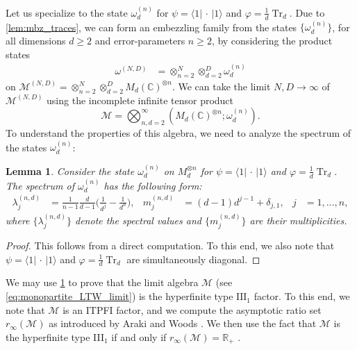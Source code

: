 \documentclass[a4paper, 10pt, onecolumn, accepted=2025-07-22]{quantumarticle}
\newtheorem{lemma}[theorem]{Lemma}
\theoremstyle{definition}
\newcommand{\ket}[1]{|#1\rangle}
\newcommand{\bra}[1]{\langle#1|}
\newcommand{\oo}{\infty}
\newcommand{\ox}{\otimes}
\newcommand{\mc}{\mathcal}
\newcommand{\III}{{\mathrm{III}}}
\newcommand{\up}[1]{^{(#1)}}
\DeclareMathOperator{\tr}{Tr}
\def\CC{{\mathbb C}}
\def\M{{\mc M}}
\def\RR{{\mathbb R}}
\newcommand*{\1}{\text{\usefont{U}{bbold}{m}{n}1}}
\newcommand{\placeholder}[0]{{\,\cdot\,}}
\begin{document}
Let us specialize to the state $\omega^{(n)}_{d}$ for $\psi = \bra{1}\placeholder\ket{1}$ and $\varphi = \tfrac{1}{d}\tr_{d}$. Due to \cref{lem:mbz_traces}, we can form an embezzling family from the states $\{\omega^{(n)}_{d}\}$, for all dimensions $d\geq 2$ and error-parameters $n\geq 2$, by considering the product states
\begin{align}
\label{eq:ltw_fam}
\omega^{(N,D)} & = \ox_{n=2}^{N}\ox_{d=2}^{D}\omega^{(n)}_{d}
\end{align}
on $\M^{(N,D)}=\ox_{n=2}^{N}\ox_{d=2}^{D}M_{d}(\CC)^{\ox n}$.
We can take the limit $N,D\to \oo$ of $\M\up{N,D}$ using the incomplete infinite tensor product 
\begin{equation}\label{eq:monopartite_LTW_limit}
    \M = \bigotimes_{n,d=2}^\oo (M_d(\CC)^{\ox n}; \omega_d\up n).
\end{equation}
To understand the properties of this algebra, we need to analyze the spectrum of the states $\omega^{(n)}_{d}$:

\begin{lemma}
\label{lem:ltw_spec}
Consider the state $\omega^{(n)}_{d}$ on $M_{d}^{\ox n}$ for $\psi = \bra{1}\placeholder\ket{1}$ and $\varphi = \tfrac{1}{d}\tr_{d}$. The spectrum of $\omega^{(n)}_{d}$ has the following form:
\begin{align}
\label{eq:ltw_spec}
\lambda^{(n,d)}_{j} & = \frac{1}{n-1}\frac{d}{d-1}\Big(\frac{1}{d^{j}}-\frac{1}{d^{n}}\Big), & m^{(n,d)}_{j} & = (d-1)d^{j-1}+\delta_{j,1}, & j & = 1,...,n,
\end{align}
where $\{\lambda^{(n,d)}_{j}\}$ denote the spectral values and $\{m^{(n,d)}_{j}\}$ are their multiplicities.
\end{lemma}
\begin{proof}
This follows from a direct computation. To this end, we also note that $\psi = \bra{1}\placeholder\ket{1}$ and $\varphi = \tfrac{1}{d}\tr_{d}$ are simultaneously diagonal.
\end{proof}


We may use \cref{lem:ltw_spec} to prove that the limit algebra $\M$ (see \eqref{eq:monopartite_LTW_limit}) is the hyperfinite type $\III_{1}$ factor. 
To this end, we note that $\M$ is an ITPFI factor, and we compute the asymptotic ratio set $r_{\infty}(\M)$ as introduced by Araki and Woods \cite{araki1968factors}. 
We then use the fact that $\M$ is the hyperfinite type III$_1$ if and only if $r_\oo(\M)=\RR_+$ \cite{haagerup_uniqueness_1987,connes1973classIII}.
\end{document}
